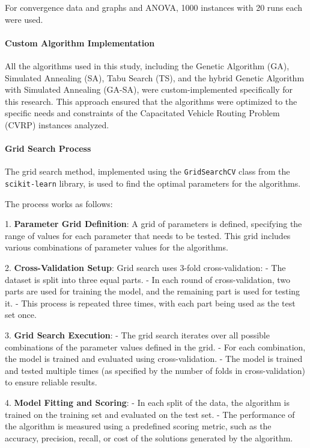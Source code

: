 \documentclass{article}
\begin{document}
    For convergence data and graphs and ANOVA, 1000 instances with 20 runs each were used.

    \paragraph{ Custom Algorithm Implementation}
    All the algorithms used in this study, including the Genetic Algorithm (GA), Simulated Annealing (SA), Tabu Search (TS), and the hybrid Genetic Algorithm with Simulated Annealing (GA-SA), were custom-implemented specifically for this research.
    This approach ensured that the algorithms were optimized to the specific needs and constraints of the Capacitated Vehicle Routing Problem (CVRP) instances analyzed.

    \paragraph{Grid Search Process}
    The grid search method, implemented using the \texttt{GridSearchCV} class from the \texttt{scikit-learn} library, is used to find the optimal parameters for the algorithms.


    The process works as follows:

    1. \textbf{Parameter Grid Definition}: A grid of parameters is defined, specifying the range of values for each parameter that needs to be tested.
    This grid includes various combinations of parameter values for the algorithms.

    2. \textbf{Cross-Validation Setup}: Grid search uses 3-fold cross-validation:
    - The dataset is split into three equal parts.
    - In each round of cross-validation, two parts are used for training the model, and the remaining part is used for testing it.
    - This process is repeated three times, with each part being used as the test set once.

    3. \textbf{Grid Search Execution}:
    - The grid search iterates over all possible combinations of the parameter values defined in the grid.
    - For each combination, the model is trained and evaluated using cross-validation.
    - The model is trained and tested multiple times (as specified by the number of folds in cross-validation) to ensure reliable results.

    4. \textbf{Model Fitting and Scoring}:
    - In each split of the data, the algorithm is trained on the training set and evaluated on the test set.
    - The performance of the algorithm is measured using a predefined scoring metric, such as the accuracy, precision, recall, or cost of the solutions generated by the algorithm.
\end{document}
